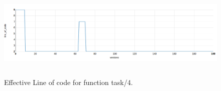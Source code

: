 \begin{figure}[h]
	\centering
	\includegraphics[height=45mm]{figures/task4.png}
	\caption{Effective Line of code for function task/4.} 
	\label{fig:task4}
\end{figure}